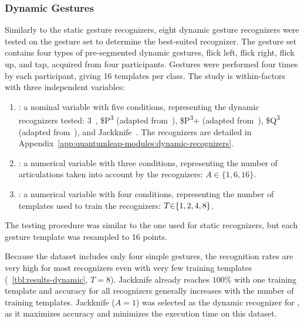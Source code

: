 \subsubsection{Dynamic Gestures}
Similarly to the static gesture recognizers, eight dynamic gesture recognizers were tested on the \lui gesture set to determine the best-suited recognizer. The gesture set contains four types of pre-segmented dynamic gestures, \ie \textsf{flick left}, \textsf{flick right}, \textsf{flick up}, and \textsf{tap}, acquired from four participants. Gestures were performed four times by each participant, giving 16 templates per class. The study is within-factors with three independent variables: 
\begin{enumerate}
    \item {}: a nominal variable with five conditions, representing the dynamic recognizers tested:  3\textcent~\cite{Caputo:2017}, \$P\textsuperscript{3} (adapted from~\cite{Vatavu:2012}), \$P\textsuperscript{3}+ (adapted from~\cite{Vatavu:2017a}), \$Q\textsuperscript{3} (adapted from~\cite{Vatavu:2018}), and Jackknife~\cite{Taranta:2017}. The recognizers are detailed in Appendix~\ref{app:quantumleap-modules:dynamic-recognizers}.
    \item {}: a numerical variable with three conditions, representing the number of articulations taken into account by the recognizers: $A{\in}\{1, 6, 16\}$.
    \item {}: a numerical variable with four conditions, representing the number of templates used to train the recognizers: $\splitatcommas{T{\in}\{1,2,4,8\}}$.
\end{enumerate}
The testing procedure was similar to the one used for static recognizers, but each gesture template was resampled to 16 points.

Because the dataset includes only four simple gestures, the recognition rates are very high for most recognizers even with very few training templates (\tab~\ref{tbl:results-dynamic}, $T{=}8$). Jackknife already reaches $100\%$ with one training template and accuracy for all recognizers generally increases with the number of training templates. %
Jackknife ($A{=}1$) was selected as the dynamic recognizer for \lui, as it maximizes accuracy and minimizes the execution time on this dataset.

